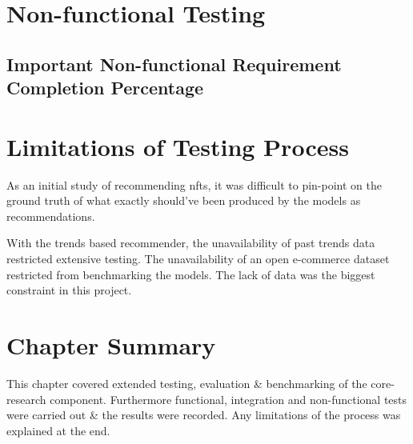 \section{Non-functional Testing}



\subsection{Important Non-functional Requirement Completion Percentage}


\section{Limitations of Testing Process}

As an initial study of recommending \gls{nft}s, it was difficult to pin-point on the ground truth of what exactly should've been produced by the models as recommendations. 

With the trends based recommender, the unavailability of past trends data restricted extensive testing. The unavailability of an open e-commerce dataset restricted from benchmarking the models. The lack of data was the biggest constraint in this project.

\section{Chapter Summary}
This chapter covered extended testing, evaluation \& benchmarking of the core-research component. Furthermore functional, integration and non-functional tests were carried out \& the results were recorded. Any limitations of the process was explained at the end.
